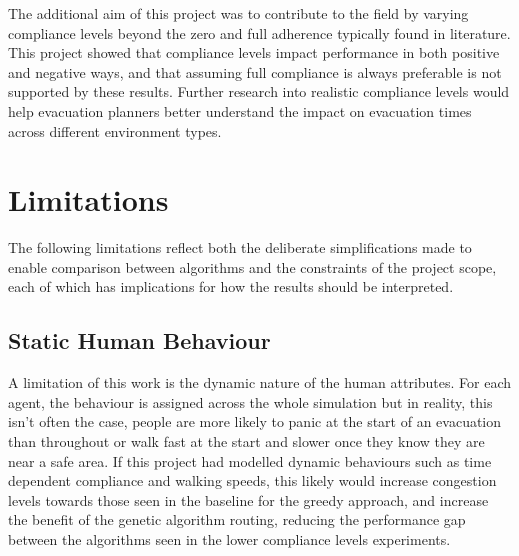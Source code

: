 \documentclass[12pt,a4paper]{report}
\begin{document}
The additional aim of this project was to contribute to the field by varying compliance levels beyond the zero and full adherence typically found in literature. This project showed that compliance levels impact performance in both positive and negative ways, and that assuming full compliance is always preferable is not supported by these results. Further research into realistic compliance levels would help evacuation planners better understand the impact on evacuation times across different environment types.

\section{Limitations}
The following limitations reflect both the deliberate simplifications made to enable comparison between algorithms and the constraints of the project scope, each of which has implications for how the results should be interpreted.

\subsection{Static Human Behaviour}
A limitation of this work is the dynamic nature of the human attributes. For each agent, the behaviour is assigned across the whole simulation but in reality, this isn’t often the case, people are more likely to panic at the start of an evacuation than throughout or walk fast at the start and slower once they know they are near a safe area. If this project had modelled dynamic behaviours such as time dependent compliance and walking speeds, this likely would increase congestion levels towards those seen in the baseline for the greedy approach, and increase the benefit of the genetic algorithm routing, reducing the performance gap between the algorithms seen in the lower compliance levels experiments.
\end{document}
